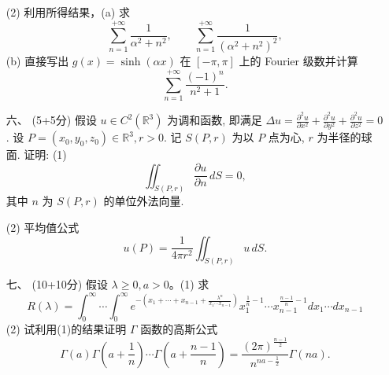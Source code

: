 \begin{enumerate}
(2) 利用所得结果，(a) 求
$$\sum_{n=1}^{+\infty} \frac{1}{\alpha^2+n^2}, \qquad 
\sum_{n=1}^{+\infty} \frac{1}{(\alpha^2+n^2)^2},$$
(b) 直接写出 $g(x)=\sinh (\alpha x)$ 在 $[-\pi, \pi]$ 上的 Fourier 级数并计算
$$\sum_{n=1}^{+\infty} \frac{(-1)^n}{n^2+1}.$$

\item[六、] (5+5分) 假设 $u \in C^2(\mathbb{R}^3)$ 为调和函数, 
即满足 $\Delta u=\frac{\partial^2 u}{\partial x^2}+\frac{\partial^2 u}{\partial y^2}+\frac{\partial^2 u}{\partial z^2}=0$. 
设 $P=(x_0, y_0, z_0) \in \mathbb{R}^3, r>0$. 记 $S(P, r)$ 为以 $P$ 点为心, $r$ 为半径的球面. 证明: (1)
$$\iint_{S(P, r)} \frac{\partial u}{\partial n}\,d S=0,$$
其中 $n$ 为 $S(P, r)$ 的单位外法向量.

(2) 平均值公式
$$u(P)=\frac{1}{4 \pi r^2} \iint_{S(P, r)} u\,d S.$$

\item[七、] (10+10分) 假设 $\lambda \geq 0, a>0$。(1) 求
$$R(\lambda)=\int_0^{\infty} \cdots \int_0^{\infty} 
e^{-\left(x_1+\cdots+x_{n-1}+\frac{\lambda^n}{x_1 \cdots x_{n-1}}\right)} 
x_1^{\frac{1}{n}-1} \cdots x_{n-1}^{\frac{n-1}{n}-1} dx_1 \cdots dx_{n-1}$$
(2) 试利用(1)的结果证明 $\Gamma$ 函数的高斯公式
$$\Gamma(a) \Gamma(a+\frac{1}{n}) \cdots \Gamma(a+\frac{n-1}{n})
=\frac{(2\pi)^{\frac{n-1}{2}}}{n^{na-\frac{1}{2}}} \Gamma(na).$$
\end{enumerate}

